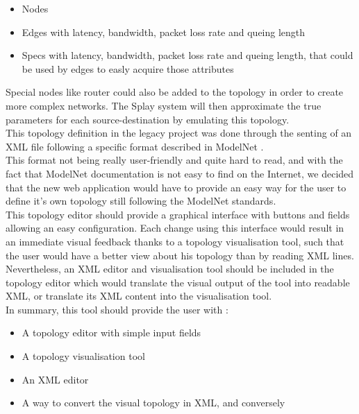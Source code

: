 \documentclass{eplmastersthesis}
\begin{document}
          \begin{itemize}
            \item Nodes
            \item Edges with latency, bandwidth, packet loss rate and queing
            length
            \item Specs with latency, bandwidth, packet loss rate and queing
            length, that could be used by edges to easly acquire those
            attributes
          \end{itemize}

          Special nodes like router could also be added to the topology in order
          to create more complex networks. The Splay system will then
          approximate the true parameters for each source-destination by
          emulating this topology.\\

          This topology definition in the legacy project was done through
          the senting of an XML file following a specific format described
          in ModelNet \cite{ModelNet}.\\
          This format not being really user-friendly and quite hard to read,
          and with the fact that ModelNet documentation is not easy to find
          on the Internet, we decided that the new web application would have
          to provide an easy way for the user to define it's own topology
          still following the ModelNet standards.\\

          This topology editor should provide a graphical interface with
          buttons and fields allowing an easy configuration. Each change
          using this interface would result in an immediate visual feedback
          thanks to a topology visualisation tool, such that the user would
          have a better view about his topology than by reading XML lines.
          Nevertheless, an XML editor and visualisation tool should be included
          in the topology editor which would translate the visual output of
          the tool into readable XML, or translate its XML content into the
          visualisation tool.\\

          In summary, this tool should provide the user with :

          \begin{itemize}
            \item A topology editor with simple input fields
            \item A topology visualisation tool
            \item An XML editor
            \item A way to convert the visual topology in XML, and conversely
          \end{itemize}
\end{document}
